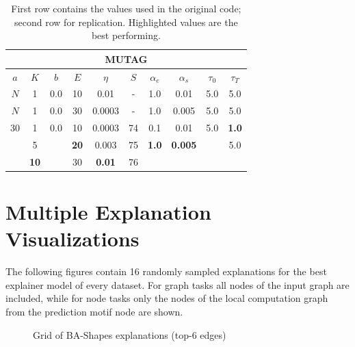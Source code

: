 \begin{table}[h]
  \centering
  \scriptsize
  \begin{tabular}{|c|c|c|c|c|c|c|c|c|c|}
  \hline
  \multicolumn{10}{|c|}{\textbf{MUTAG}} \\ \hline
  $a$ & $K$ & $b$ & $E$ & $\eta$ & $S$ & $\alpha_e$ & $\alpha_s$ & $\tau_0$ & $\tau_T$ \\ \hline
  $N$ & 1 & 0.0 & 10 & 0.01 & - & 1.0 & 0.01 & 5.0 & 5.0 \\ \hline
  $N$ & 1 & 0.0 & 30 & 0.0003 & - & 1.0 & 0.005 & 5.0 & 5.0 \\ \midrule
  30 & 1 & 0.0 & 10 & 0.0003 & 74 & 0.1 & 0.01 & 5.0 & \textbf{1.0} \\
   & 5 &  & \textbf{20} & 0.003 & 75 & \textbf{1.0} & \textbf{0.005} &  & 5.0 \\
   & \textbf{10} &  & 30 & \textbf{0.01} & 76 &  &  &  &  \\ \hline
  \end{tabular}
  \caption[MUTAG Sweep]{First row contains the values used in the original code; second row for replication. Highlighted values are the best performing.}
\end{table}

\clearpage
\section{Multiple Explanation Visualizations}
The following figures contain 16 randomly sampled explanations for the best explainer model of every dataset. For graph tasks all nodes of the input graph are included, while for node tasks only the nodes of the local computation graph from the prediction motif node are shown.

\begin{figure}[htbp]
    \centering
    \caption{Grid of BA-Shapes explanations (top-6 edges)}
    \label{fig:grid-BA-Shapes-explanations}
\end{figure}

